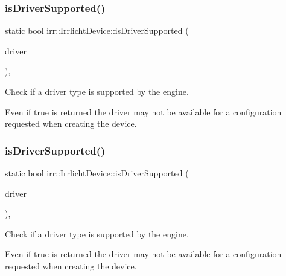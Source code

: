 \subsubsection{\texorpdfstring{is\+Driver\+Supported()}{isDriverSupported()}\hspace{0.1cm}{\footnotesize\ttfamily [1/3]}}
{\footnotesize\ttfamily static bool irr\+::\+Irrlicht\+Device\+::is\+Driver\+Supported (\begin{DoxyParamCaption}\item[{\hyperlink{namespaceirr_1_1video_ae35a6de6d436c76107ad157fe42356d0}{video\+::\+E\+\_\+\+D\+R\+I\+V\+E\+R\+\_\+\+T\+Y\+PE}}]{driver }\end{DoxyParamCaption})\hspace{0.3cm}{\ttfamily [inline]}, {\ttfamily [static]}}



Check if a driver type is supported by the engine. 

Even if true is returned the driver may not be available for a configuration requested when creating the device. \mbox{\label{classirr_1_1IrrlichtDevice_a5a74995aec731b26c6a9cb5bea6842fe}} 
\subsubsection{\texorpdfstring{is\+Driver\+Supported()}{isDriverSupported()}\hspace{0.1cm}{\footnotesize\ttfamily [2/3]}}
{\footnotesize\ttfamily static bool irr\+::\+Irrlicht\+Device\+::is\+Driver\+Supported (\begin{DoxyParamCaption}\item[{\hyperlink{namespaceirr_1_1video_ae35a6de6d436c76107ad157fe42356d0}{video\+::\+E\+\_\+\+D\+R\+I\+V\+E\+R\+\_\+\+T\+Y\+PE}}]{driver }\end{DoxyParamCaption})\hspace{0.3cm}{\ttfamily [inline]}, {\ttfamily [static]}}



Check if a driver type is supported by the engine. 

Even if true is returned the driver may not be available for a configuration requested when creating the device. \mbox{\label{classirr_1_1IrrlichtDevice_a5a74995aec731b26c6a9cb5bea6842fe}} 
